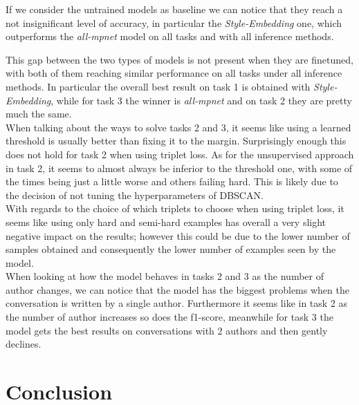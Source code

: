 \documentclass[11pt]{article}
\begin{document}
If we consider the untrained models as baseline we can notice that they reach a not insignificant level of accuracy, in particular the \textit{Style-Embedding} one, which outperforms the \textit{all-mpnet} model on all tasks and with all inference methods.

This gap between the two types of models is not present when they are finetuned, with both of them reaching similar performance on all tasks under all inference methods.
In particular the overall best result on task 1 is obtained with \textit{Style-Embedding}, while for task 3 the winner is \textit{all-mpnet} and on task 2 they are pretty much the same.\\

When talking about the ways to solve tasks 2 and 3, it seems like using a learned threshold is usually better than fixing it to the margin. Surprisingly enough this does not hold for task 2 when using triplet loss.
As for the unsupervised approach in task 2, it seems to almost always be inferior to the threshold one, with some of the times being just a little worse and others failing hard. This is likely due to the decision of not tuning the hyperparameters of DBSCAN.\\

With regards to the choice of which triplets to choose when using triplet loss, it seems like using only hard and semi-hard examples has overall a very slight negative impact on the results; however this could be due to the lower number of samples obtained and consequently the lower number of examples seen by the model.\\

When looking at how the model behaves in tasks 2 and 3 as the number of author changes, we can notice that the model has the biggest problems when the conversation is written by a single author. Furthermore it seems like in task 2 as the number of author increases so does the f1-score, meanwhile for task 3 the model gets the best results on conversations with 2 authors and then gently declines.
\section{Conclusion}
\label{sec:conclusion}




\end{document}
